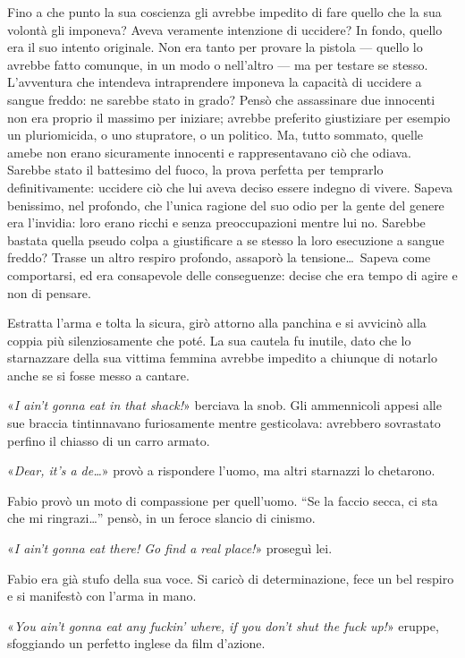 Fino a che punto la sua coscienza gli avrebbe impedito di fare quello che la sua volontà gli imponeva? Aveva veramente intenzione di uccidere? In fondo, quello era il suo intento originale. Non era tanto per provare la pistola --- quello lo avrebbe fatto comunque, in un modo o nell'altro --- ma per testare se stesso. L'avventura che intendeva intraprendere imponeva la capacità di uccidere a sangue freddo: ne sarebbe stato in grado? Pensò che assassinare due innocenti non era proprio il massimo per iniziare; avrebbe preferito giustiziare per esempio un pluriomicida, o uno stupratore, o un politico. Ma, tutto sommato, quelle amebe non erano sicuramente innocenti e rappresentavano ciò che odiava. Sarebbe stato il battesimo del fuoco, la prova perfetta per temprarlo definitivamente: uccidere ciò che lui aveva deciso essere indegno di vivere. Sapeva benissimo, nel profondo, che l'unica ragione del suo odio per la gente del genere era l'invidia: loro erano ricchi e senza preoccupazioni mentre lui no. Sarebbe bastata quella pseudo colpa a giustificare a se stesso la loro esecuzione a sangue freddo? Trasse un altro respiro profondo, assaporò la tensione\ldots\ Sapeva come comportarsi, ed era consapevole delle conseguenze: decise che era tempo di agire e non di pensare.

Estratta l'arma e tolta la sicura, girò attorno alla panchina e si avvicinò alla coppia più silenziosamente che poté. La sua cautela fu inutile, dato che lo starnazzare della sua vittima femmina avrebbe impedito a chiunque di notarlo anche se si fosse messo a cantare.

«\textit{I ain't gonna eat in that shack!}» berciava la snob. Gli ammennicoli appesi alle sue braccia tintinnavano furiosamente mentre gesticolava: avrebbero sovrastato perfino il chiasso di un carro armato.

«\textit{Dear, it's a de\ldots}» provò a rispondere l'uomo, ma altri starnazzi lo chetarono.

Fabio provò un moto di compassione per quell'uomo. ``Se la faccio secca, ci sta che mi ringrazi\ldots'' pensò, in un feroce slancio di cinismo.

«\textit{I ain't gonna eat there! Go find a real place!}» proseguì lei.

Fabio era già stufo della sua voce. Si caricò di determinazione, fece un bel respiro e si manifestò con l'arma in mano.

«\textit{You ain't gonna eat any fuckin' where, if you don't shut the fuck up!}» eruppe, sfoggiando un perfetto inglese da film d'azione.

